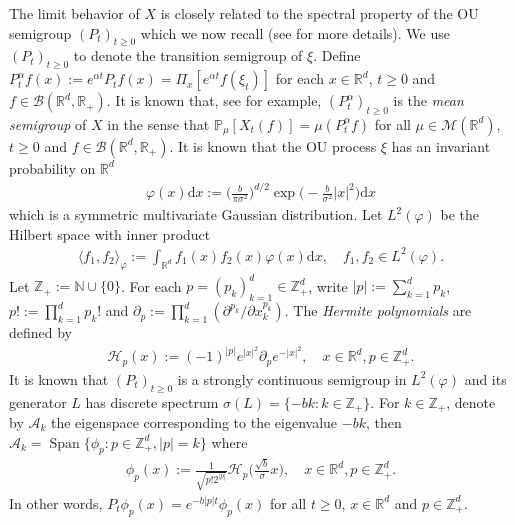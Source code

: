 \documentclass[12pt,a4paper]{amsart}
\theoremstyle{plain}
\theoremstyle{definition}
\numberwithin{equation}{section}
\begin{document}
The limit behavior of $X$  is closely related to the spectral property of the OU semigroup $(P_t)_{t\geq 0}$ which we now recall (see \cite{MetafunePallaraPriola2002Spectrum} for more details).
We use  $(P_t)_{t\geq 0}$ to denote the transition semigroup of $\xi$.	
Define
\(
P^{\alpha}_t f(x)
  := e^{\alpha t} P_t f(x)
  = \Pi_x [e^{\alpha t}f(\xi_t)]
\)
for each $x\in \mathbb R^d$, $t\geq 0$ and $f\in \mathcal B(\mathbb R^d, \mathbb R_+)$.
It is known that, see \cite[Proposition 2.27]{Li2011Measure-valued} for example, $(P^\alpha_t)_{t\geq 0}$ is the \emph{mean semigroup} of $X$ in the sense that
\(
  \mathbb{P}_{\mu}[X_t (f)]  = \mu( P^\alpha_t f)
\)
for all $\mu\in \mathcal M(\mathbb R^d)$, $t\geq 0$ and $f\in \mathcal B(\mathbb R^d, \mathbb R_+)$.
It is known that the OU process $\xi$ has an invariant probability on $\mathbb R^d$
\begin{align}
  \varphi(x)\mathrm dx
  :=\Big (\frac{b}{\pi \sigma^2}\Big )^{d/2}\exp \Big(-\frac{b}{\sigma^2}|x|^2 \Big)\mathrm dx
\end{align}
which is a   symmetric multivariate Gaussian distribution.
Let $L^2(\varphi)$ be the Hilbert space with inner product
\begin{align}
  \langle f_1, f_2 \rangle_{\varphi}
  := \int_{\mathbb R^d}f_1(x)f_2(x)\varphi(x) \mathrm dx, \quad f_1,f_2 \in L^2(\varphi).
\end{align}
Let $\mathbb Z_+ := \mathbb N\cup\{0\}$.
For each $p = (p_k)_{k = 1}^d \in \mathbb{Z}_+^{d}$, write $|p|:=\sum_{k=1}^d p_k$, $p!:= \prod_{k= 1}^d p_k!$ and $\partial_p:= \prod_{k = 1}^d(\partial^{p_k}/\partial x_k^{p_k})$.
The \emph{Hermite polynomials} are defined by
\begin{align}
  \mathcal H_p(x)
  :=(-1)^{|p|}e^{|x|^2} \partial_p e^{-|x|^2}
  , \quad x\in \mathbb R^d, p \in \mathbb{Z}_+^{d}.
\end{align}
It is known that $(P_t)_{t\geq 0}$ is a strongly continuous semigroup in $L^2(\varphi)$ and its generator $L$ has discrete spectrum $\sigma(L)= \{-bk: k \in \mathbb Z_+\}$.
For $k \in \mathbb Z_+$, denote by $\mathcal{A}_k$ the eigenspace corresponding to the eigenvalue $-bk$, then $ \mathcal{A}_k = \operatorname{Span} \{\phi_p : p\in \mathbb Z_+^d, |p|=k\}$ where
\begin{align}
  \phi_p(x)
  := \frac{1}{\sqrt{ p! 2^{|p|} }} \mathcal H_p \Big(\frac{ \sqrt{b} }{\sigma}x \Big)
  , \quad x\in \mathbb R^d, p\in \mathbb Z_+^d.
\end{align}
In other words,
\(
  P_t\phi_p(x)
  = e^{-b|p|t}\phi_p(x)
\)
for all $t\geq 0$, $x\in \mathbb R^d$ and $p\in \mathbb Z_+^d$.
\end{document}
